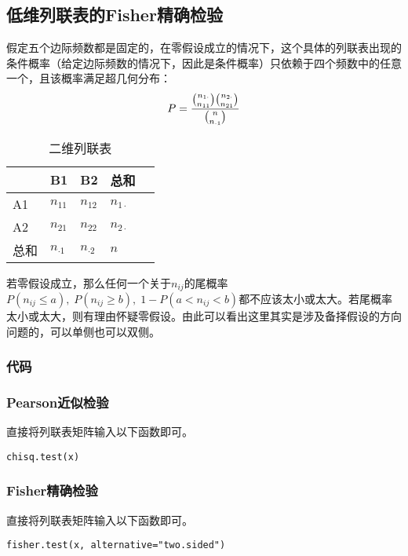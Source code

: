 \subsection{低维列联表的Fisher精确检验}
假定五个边际频数都是固定的，在零假设成立的情况下，这个具体的列联表出现的条件概率（给定边际频数的情况下，因此是条件概率）只依赖于四个频数中的任意一个，且该概率满足超几何分布：
\begin{equation}
	P=\frac{\binom{n_{1\cdot}}{n_{11}}\binom{n_{2\cdot}}{n_{21}}}{\binom{n}{n_{\cdot 1}}}\notag
\end{equation}

\begin{table}[htbp]
	\centering
	\begin{tabular}{@{}lllll@{}}
		\toprule
		     & B1           & B2           & 总和      \\ 
		\midrule
		A1   & $n_{11}$       & $n_{12}$       & $n_{1\cdot}$\\
		A2   & $n_{21}$       & $n_{22}$       & $n_{2\cdot}$\\
		总和 & $n_{\cdot 1}$  & $n_{\cdot 2}$  & $n$          \\ 
		\bottomrule
	\end{tabular}
	\caption{二维列联表}
\end{table}

若零假设成立，那么任何一个关于$n_{ij}$的尾概率$P(n_{ij}\leqslant a),\;P(n_{ij}\geqslant b),\;1-P(a<n_{ij}<b)$都不应该太小或太大。若尾概率太小或太大，则有理由怀疑零假设。由此可以看出这里其实是涉及备择假设的方向问题的，可以单侧也可以双侧。\par
\subsubsection{代码}
\subsubsection{Pearson近似检验}
直接将列联表矩阵输入以下函数即可。
\begin{verbatim}
chisq.test(x)
\end{verbatim}
\subsubsection{Fisher精确检验}
直接将列联表矩阵输入以下函数即可。
\begin{verbatim}
fisher.test(x, alternative="two.sided")
\end{verbatim}